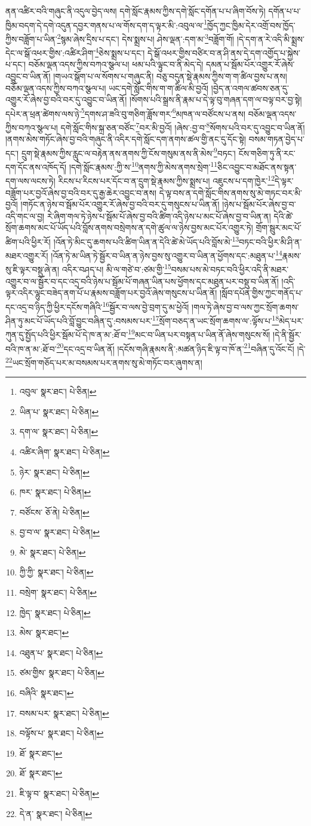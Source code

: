 ནན་འཚིར་བའི་གཞུང་ནི་འདུལ་བྱེད་ལས། དགེ་སློང་རྣམས་ཀྱིས་དགེ་སློང་དགོན་པ་པ་ཞིག་བོས་ཏེ། དགོན་པ་པ་ཁྱིམ་བདག་དེ་དགེ་འདུན་དབྱར་གནས་པ་ལ་གོས་དག་ད་ལྟར་མི་:འབུལ་ལ་\footnote{འབུལ་  སྣར་ཐང་།  པེ་ཅིན། }ཁྱོད་ཀྱང་ཁྱིམ་དེར་འགྲོ་བས་ཁྱོད་ཀྱིས་བཟློག་པ་ཡིན་\footnote{ཡིན་པ་  སྣར་ཐང་།  པེ་ཅིན། }སྙམ་ཞེས་དྲིས་པ་དང་། དེས་སྨྲས་པ། ཤེས་ལྡན་:དག་མ་\footnote{དག་ལ་  སྣར་ཐང་།  པེ་ཅིན། }བཟློག་གོ། །དེ་དག་ན་རེ་འདི་མི་སྨྲས་དེང་ལ་སྒོ་འཕར་གྱིས་:འཚིར་ཤིག་\footnote{འཚིར་ཞིག་  སྣར་ཐང་།  པེ་ཅིན། }ཅེས་སྨྲས་པ་དང་། དེ་སྒོ་འཕར་གྱིས་བཙིར་བ་ན་ཤི་ནས་དེ་དག་འགྱོད་པ་སྐྱེས་པ་དང་། བཅོམ་ལྡན་འདས་ཀྱིས་བཀའ་སྩལ་པ། ཕམ་པའི་ལྟུང་བ་ནི་མེད་དེ། དམན་པ་སྦོམ་པོར་འགྱུར་རོ་ཞེས་འབྱུང་བ་ཡིན་ནོ། །གཡའ་སྒོག་པ་ལ་སོགས་པ་གཞུང་ནི། བཅུ་བདུན་སྡེ་རྣམས་ཀྱིས་ག་ག་ཚིལ་བྱས་པ་ནས། བཅོམ་ལྡན་འདས་ཀྱིས་བཀའ་སྩལ་པ། ཡང་དགེ་སློང་གིས་ག་ག་ཚིལ་མི་བྱའོ། །བྱེད་ན་འགལ་ཚབས་ཅན་དུ་འགྱུར་རོ་ཞེས་བྱ་བའི་བར་དུ་འབྱུང་བ་ཡིན་ནོ། །སོགས་པའི་སྒྲས་ནི་རྣམ་པ་དེ་ལྟ་བུ་གཞན་དག་ལ་བལྟ་བར་བྱ་སྟེ། དཔེར་ན་ཕྲན་ཚེགས་ལས་ཉེ་\footnote{ཉེར་  སྣར་ཐང་།  པེ་ཅིན། }དགས་ཤ་ཟའི་བུ་གཅིག་ཟློས་གར་\footnote{ཁར་  སྣར་ཐང་།  པེ་ཅིན། }མཁན་ལ་བཙོངས་པ་ནས། བཅོམ་ལྡན་འདས་ཀྱིས་བཀའ་སྩལ་པ། དགེ་སློང་གིས་སྐྲ་ཅན་བཙོང་\footnote{བཙོངས་  ཅོ་ནེ།  པེ་ཅིན། }བར་མི་བྱའོ། །ཞེས་:བྱ་བ་\footnote{བྱ་བ་ལ་  སྣར་ཐང་།  པེ་ཅིན། }སོགས་པའི་བར་དུ་འབྱུང་བ་ཡིན་ནོ། །ནགས་མེས་གཏོང་ཞེས་བྱ་བའི་གཞུང་ནི་འདིར་དགེ་སློང་དག་ནགས་ཚལ་གྱི་ནང་དུ་དོང་སྟེ། བསམ་གཏན་བྱེད་པ་དང་། དྲུག་སྡེ་རྣམས་ཀྱིས་རླུང་ལ་བརྟེན་ནས་ནགས་ཀྱི་ངོས་གསུམ་ནས་ནི་མེས་\footnote{མེ་  སྣར་ཐང་།  པེ་ཅིན། }བཏང་། ངོས་གཅིག་ཏུ་ནི་རང་དག་དོང་ནས་འཁོད་དོ། །དགེ་སློང་རྣམས་:ཀྱི་ས་\footnote{ཀྱི་ཀྱི་  སྣར་ཐང་།  པེ་ཅིན། }ནགས་ཀྱི་མེས་ནགས་སྲེག་\footnote{བསྲེག་  སྣར་ཐང་།  པེ་ཅིན། }ཅིང་འབྱུང་བ་མཐོང་ནས་སྟན་དག་ལས་ལངས་ཏེ། རིངས་པ་རིངས་པར་དོང་བ་ན་དྲུག་སྡེ་རྣམས་ཀྱིས་སྨྲས་པ། འཇུངས་པ་དག་ཁྱེར་\footnote{ཁྱེད་  སྣར་ཐང་།  པེ་ཅིན། }དེ་ལྟར་བཟློག་པར་བྱའོ་ཞེས་བྱ་བའི་བར་དུ་རྒྱ་ཆེར་འབྱུང་བ་ནས། དེ་ལྟ་བས་ན་དགེ་སློང་གིས་ནགས་སུ་མེ་གཏང་བར་མི་བྱའོ། །གཏོང་ན་ཉེས་བ་སྦོམ་པོར་འགྱུར་རོ་ཞེས་བྱ་བའི་བར་དུ་གསུངས་པ་ཡིན་ནོ། །ཉེས་པ་སྦོམ་པོར་ཞེས་བྱ་བ་འདི་གང་ལ་བྱ། རེ་ཞིག་གལ་ཏེ་ཉེས་པ་སྦོམ་པོ་ཞེས་བྱ་བའི་ཚིག་འདི་ཉེས་པ་མང་པོ་ཞེས་བྱ་བ་ཡིན་ན། དེའི་ཚེ་སྲོག་ཆགས་མང་པོ་ཡོད་པའི་བློས་ནགས་བསྲེགས་ན་དགེ་ཚུལ་ལ་ཉེས་བྱས་མང་པོར་འགྱུར་ཏེ། གྲོག་སྦུར་མང་པོ་ཚིག་པའི་ཕྱིར་རོ། །འོན་ཏེ་མིང་དུ་ཆགས་པའི་ཚིག་ཡིན་ན་དེའི་ཚེ་མེ་ཡོད་པའི་བློས་མེ་\footnote{མེས་  སྣར་ཐང་། }བཏང་བའི་ཕྱིར་མི་ཤི་ན་མཐར་འགྱུར་རོ། །འོན་ཏེ་མ་ཡིན་ཏེ་སྦྱོར་བ་ཡིན་ན་ཉེས་བྱས་སུ་འགྱུར་བ་ཡིན་ན་ཕྱོགས་དང་:མཐུན་པ་\footnote{འཐུན་པ་  སྣར་ཐང་།  པེ་ཅིན། }རྣམས་སུ་ཇི་ལྟར་བསྡུ་ཞེ་ན། འདིར་བཤད་པ། མི་ལ་གཙེ་བ་:ཙམ་གྱི་\footnote{ཙམ་གྱིས་  སྣར་ཐང་།  པེ་ཅིན། }བསམ་པས་མེ་བཏང་བའི་ཕྱིར་འདི་ནི་མཐར་འགྱུར་བ་ལ་སྦྱོར་བ་དང་འདྲ་བའི་ཉེས་པ་སྦོམ་པོ་གཞན་ཡིན་པས་ཕྱོགས་དང་མཐུན་པར་བསྡུ་བ་ཡིན་ནོ། །འདི་ལྟར་འདིར་ལྷུང་བཟེད་ནག་པོ་པ་རྣམས་བཟློག་པར་བྱའོ་ཞེས་གསུངས་པ་ཡིན་ནོ། །སློབ་དཔོན་གྱིས་ཀྱང་གནོད་པ་དང་འདྲ་བ་ཉིད་ཀྱི་ཕྱིར་དངོས་གཞིའི་\footnote{བཞིའི་  སྣར་ཐང་། }སྦྱོར་བ་ལས་བྱེ་བྲག་དུ་མ་ཕྱེའོ། །གལ་ཏེ་ཞེས་བྱ་བ་ལས་ཀྱང་སྲོག་ཆགས་ཤིན་ཏུ་མང་པོ་ཡོད་པའི་བློ་བྱུང་བཞིན་དུ་:བསམས་པར་\footnote{བསམ་པར་  སྣར་ཐང་།  པེ་ཅིན། }སྲོག་བཅད་ན་ཡང་སྲོག་ཆགས་ལ་:ལྟོས་པ་\footnote{བལྟོས་པ་  སྣར་ཐང་།  པེ་ཅིན། }མེད་པར་ཀུན་དུ་སྤྱོད་པའི་ཕྱིར་སྦོམ་པོ་དེ་ཁ་ན་མ་:ཐོ་བ་\footnote{ཐོ་  སྣར་ཐང་། }མང་བ་ཡིན་པར་བསྟན་པ་ཡིན་ནོ་ཞེས་གསུངས་སོ། །དེ་ནི་སྦྱོར་བའི་ཁ་ན་མ་:ཐོ་བ་\footnote{ཐོ་  སྣར་ཐང་། }དང་འདྲ་བ་ཡིན་ནོ། །དངོས་གཞི་རྣམས་ནི་:མཚན་ཉིད་ཇི་ལྟ་བ་ཁོ་ན་\footnote{ཇི་ལྟ་བ་  སྣར་ཐང་།  པེ་ཅིན། }བཞིན་དུ་འོང་ངོ། །དེ་\footnote{དེ་ན་  སྣར་ཐང་།  པེ་ཅིན། }ཡང་སྲོག་གཅོད་པར་མ་བསམས་པར་ནགས་སུ་མེ་གཏོང་བར་ཞུགས་ན། 